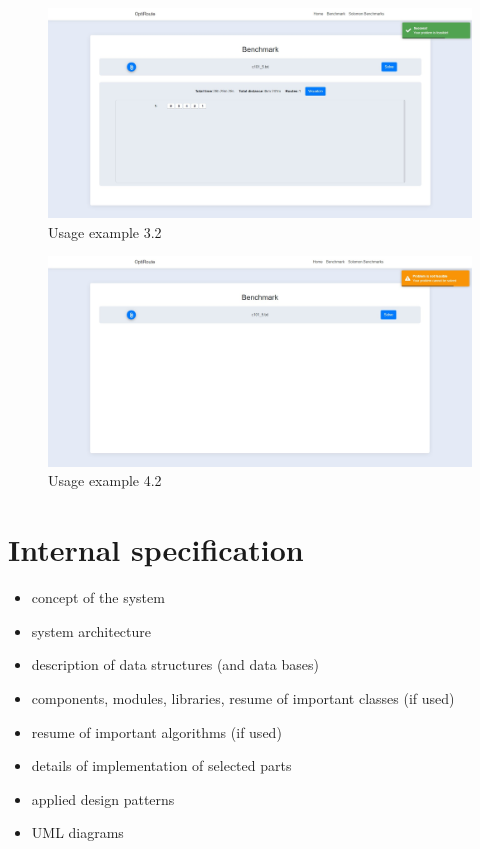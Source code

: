 \documentclass[a4paper,twoside,12pt]{book}
\begin{document}
\begin{figure}[H]
\centering
\includegraphics[width=\textwidth]{images/benchmarkSuccess.jpg}
\caption{Usage example 3.2}
\label{fig:benchmarkSuccess}
\end{figure}

\begin{figure}[H]
\centering
\includegraphics[width=\textwidth]{images/benchmarkFailed.jpg}
\caption{Usage example 4.2}
\label{fig:benchmarkFailed}
\end{figure}


\chapter{Internal specification}

\begin{itemize}
\item concept of the system
\item system architecture
\item description of data structures (and data bases)
\item components, modules, libraries, resume of important classes (if used)
\item resume of important algorithms (if used)
\item details of implementation of selected parts
\item applied design patterns
\item UML diagrams
\end{itemize}
\end{document}
